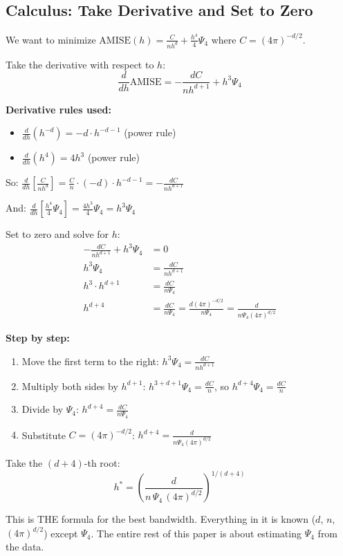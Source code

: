 \documentclass[12pt]{article}
\newcommand{\note}[1]{\begin{tcolorbox}[colback=yellow!5,colframe=yellow!60!black,breakable]\small #1\end{tcolorbox}}
\newcommand{\whythis}[1]{\begin{tcolorbox}[colback=orange!5,colframe=orange!50!black,title=Why?,breakable]\small #1\end{tcolorbox}}
\begin{document}
\subsection{Calculus: Take Derivative and Set to Zero}

We want to minimize $\text{AMISE}(h) = \frac{C}{nh^d} + \frac{h^4}{4}\Psi_4$ where $C = (4\pi)^{-d/2}$.

Take the derivative with respect to $h$:
$$\frac{d}{dh}\text{AMISE} = -\frac{dC}{nh^{d+1}} + h^3 \Psi_4$$

\note{
\textbf{Derivative rules used:}
\begin{itemize}
\item $\frac{d}{dh}(h^{-d}) = -d \cdot h^{-d-1}$ (power rule)
\item $\frac{d}{dh}(h^4) = 4h^3$ (power rule)
\end{itemize}
So: $\frac{d}{dh}\left[\frac{C}{nh^d}\right] = \frac{C}{n} \cdot (-d) \cdot h^{-d-1} = -\frac{dC}{nh^{d+1}}$

And: $\frac{d}{dh}\left[\frac{h^4}{4}\Psi_4\right] = \frac{4h^3}{4}\Psi_4 = h^3\Psi_4$}

Set to zero and solve for $h$:
\begin{align*}
-\frac{dC}{nh^{d+1}} + h^3\Psi_4 &= 0 \\[6pt]
h^3\Psi_4 &= \frac{dC}{nh^{d+1}} \\[6pt]
h^3 \cdot h^{d+1} &= \frac{dC}{n\Psi_4} \\[6pt]
h^{d+4} &= \frac{dC}{n\Psi_4} = \frac{d(4\pi)^{-d/2}}{n\Psi_4} = \frac{d}{n\Psi_4(4\pi)^{d/2}}
\end{align*}

\note{
\textbf{Step by step:}
\begin{enumerate}
\item Move the first term to the right: $h^3\Psi_4 = \frac{dC}{nh^{d+1}}$
\item Multiply both sides by $h^{d+1}$: $h^{3+d+1}\Psi_4 = \frac{dC}{n}$, so $h^{d+4}\Psi_4 = \frac{dC}{n}$
\item Divide by $\Psi_4$: $h^{d+4} = \frac{dC}{n\Psi_4}$
\item Substitute $C = (4\pi)^{-d/2}$: $h^{d+4} = \frac{d}{n\Psi_4(4\pi)^{d/2}}$
\end{enumerate}
}

Take the $(d+4)$-th root:
$$\boxed{h^* = \left(\frac{d}{n\,\Psi_4\,(4\pi)^{d/2}}\right)^{1/(d+4)}}$$

\whythis{This is THE formula for the best bandwidth. Everything in it is known ($d$, $n$, $(4\pi)^{d/2}$) except $\Psi_4$. The entire rest of this paper is about estimating $\Psi_4$ from the data.}
\end{document}
